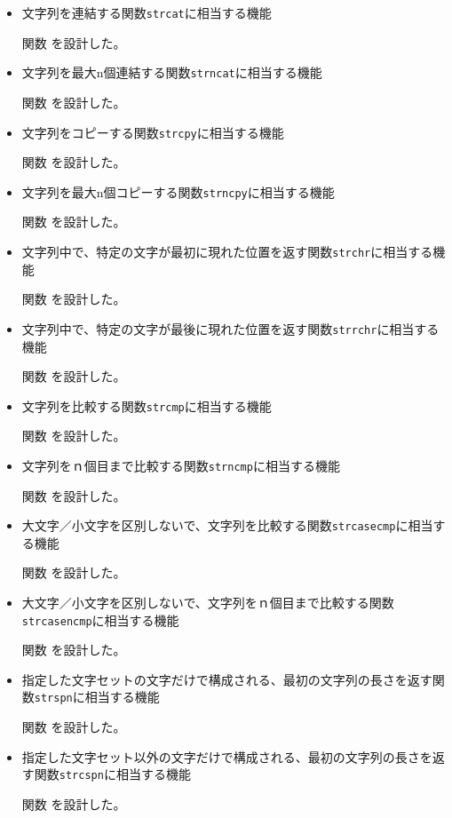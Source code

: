 \begin{enumerate}
     \begin{itemize}
     \item 文字列を連結する関数\texttt{strcat}に相当する機能\par 
       関数 を設計した。
     \item 文字列を最大n個連結する関数\texttt{strncat}に相当する機能\par 
       関数 を設計した。
     \item 文字列をコピーする関数\texttt{strcpy}に相当する機能\par 
       関数 を設計した。
     \item 文字列を最大n個コピーする関数\texttt{strncpy}に相当する機能\par 
       関数 を設計した。
     \item 文字列中で、特定の文字が最初に現れた位置を返す関数\texttt{strchr}に相当する機能\par 
       関数 を設計した。
     \item 文字列中で、特定の文字が最後に現れた位置を返す関数\texttt{strrchr}に相当する機能\par 
       関数 を設計した。
     \item 文字列を比較する関数\texttt{strcmp}に相当する機能\par 
       関数 を設計した。
     \item 文字列をｎ個目まで比較する関数\texttt{strncmp}に相当する機能\par 
       関数 を設計した。
     \item 大文字／小文字を区別しないで、文字列を比較する関数\texttt{strcasecmp}に相当する機能\par 
       関数 を設計した。
     \item 大文字／小文字を区別しないで、文字列をｎ個目まで比較する関数\texttt{strcasencmp}に相当する機能\par 
       関数 を設計した。
     \item 指定した文字セットの文字だけで構成される、最初の文字列の長さを返す関数\texttt{strspn}に相当する機能\par 
       関数 を設計した。
     \item 指定した文字セット以外の文字だけで構成される、最初の文字列の長さを返す関数\texttt{strcspn}に相当する機能\par 
       関数 を設計した。

\end{itemize}
\end{enumerate}

